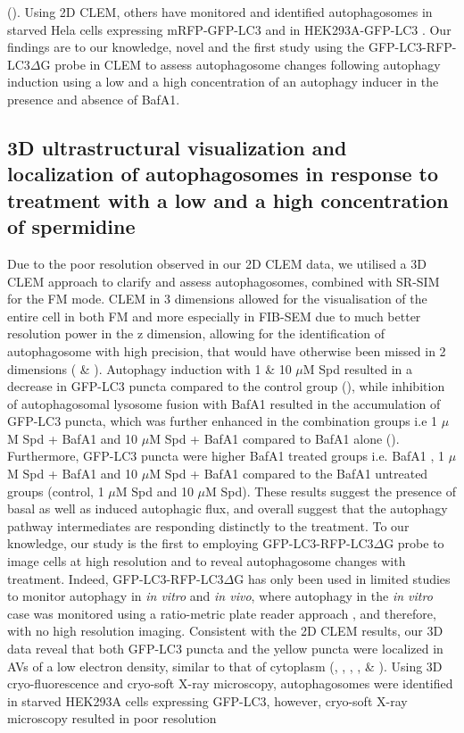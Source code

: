 (). Using 2D CLEM, others have monitored and identified autophagosomes in starved Hela cells expressing mRFP-GFP-LC3 \citep{Gudmundsson2019} and in HEK293A-GFP-LC3 \citep{Razi2009}. Our findings are to our knowledge, novel and the first study using the GFP-LC3-RFP-LC3$\Delta$G probe in CLEM to assess autophagosome changes following autophagy induction using a low and a high concentration  of an autophagy inducer in the presence and absence of BafA1.

\subsection{3D ultrastructural visualization and localization of autophagosomes  in response to treatment with a low and a high concentration of spermidine}
Due to the poor resolution observed in our 2D CLEM data, we utilised a  3D CLEM approach to clarify and assess autophagosomes, combined with SR-SIM for the FM mode. CLEM in 3 dimensions allowed for the visualisation of the entire cell in both FM and more especially in FIB-SEM due to much better resolution power in the z dimension, allowing for the identification of autophagosome with high precision, that would have otherwise been missed in 2 dimensions ( \& ). Autophagy induction with 1 \& 10 $\mu$M Spd resulted in a decrease in GFP-LC3 puncta compared to the control group (), while inhibition of autophagosomal lysosome fusion with BafA1 resulted in the accumulation of GFP-LC3 puncta, which was further enhanced in the combination groups i.e 1 $\mu$M Spd + BafA1 and 10 $\mu$M Spd + BafA1 compared to BafA1 alone (). Furthermore, GFP-LC3 puncta were higher BafA1 treated groups i.e. BafA1 , 1 $\mu$M Spd + BafA1 and 10 $\mu$M Spd + BafA1 compared to the BafA1 untreated groups (control, 1 $\mu$M Spd and 10 $\mu$M Spd). These results suggest the presence of basal as well as induced autophagic flux, and overall suggest that the autophagy pathway intermediates are responding distinctly to the treatment. To our knowledge, our study is the first to employing GFP-LC3-RFP-LC3$\Delta$G probe to image cells at high resolution and to reveal autophagosome changes with treatment. Indeed, GFP-LC3-RFP-LC3$\Delta$G has only been used in limited studies to monitor autophagy in \textit{in vitro} and \textit{in vivo}, where autophagy in the \textit{in vitro} case was monitored using a ratio-metric plate reader approach \citep{Kaizuka2016}, and therefore, with no high resolution imaging. Consistent with the 2D CLEM results, our 3D data reveal that both GFP-LC3 puncta and the yellow puncta were localized in AVs of a low electron density, similar to that of cytoplasm (, , , ,  \& ). Using 3D cryo-fluorescence and cryo-soft X-ray microscopy, autophagosomes were identified in starved HEK293A cells expressing GFP-LC3, however, cryo-soft X-ray microscopy resulted in poor resolution 